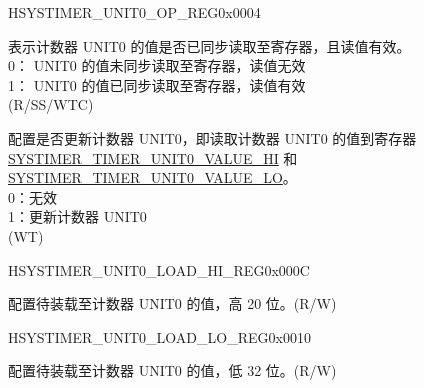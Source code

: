 \begin{register}{H}{SYSTIMER\_UNIT0\_OP\_REG}{0x0004}\label{regdesc:SYSTIMERUNIT0OPREG}
%
%
%
%
\regnewline%
\begin{regdesc}\begin{reglist}
\label{fielddesc:SYSTIMERTIMERUNIT0VALUEVALID}\item [SYSTIMER\_TIMER\_UNIT0\_VALUE\_VALID] 表示计数器 UNIT0 的值是否已同步读取至寄存器，且读值有效。\\
0： UNIT0 的值未同步读取至寄存器，读值无效\\
1： UNIT0 的值已同步读取至寄存器，读值有效\\
(R/SS/WTC)
\label{fielddesc:SYSTIMERTIMERUNIT0UPDATE}\item [SYSTIMER\_TIMER\_UNIT0\_UPDATE] 配置是否更新计数器 UNIT0，即读取计数器 UNIT0 的值到寄存器 \hyperref[fielddesc:SYSTIMERTIMERUNIT0VALUEHI]{SYSTIMER\_TIMER\_UNIT0\_VALUE\_HI} 和 \hyperref[fielddesc:SYSTIMERTIMERUNIT0VALUELO]{SYSTIMER\_TIMER\_UNIT0\_VALUE\_LO}。\\
0：无效\\
1：更新计数器 UNIT0\\
(WT)
\end{reglist}\end{regdesc}
\end{register}


\begin{register}{H}{SYSTIMER\_UNIT0\_LOAD\_HI\_REG}{0x000C}\label{regdesc:SYSTIMERUNIT0LOADHIREG}
%
%
\regnewline%
\begin{regdesc}\begin{reglist}
\label{fielddesc:SYSTIMERTIMERUNIT0LOADHI}\item [SYSTIMER\_TIMER\_UNIT0\_LOAD\_HI] 配置待装载至计数器 UNIT0 的值，高 20 位。(R/W)
\end{reglist}\end{regdesc}
\end{register}


\begin{register}{H}{SYSTIMER\_UNIT0\_LOAD\_LO\_REG}{0x0010}\label{regdesc:SYSTIMERUNIT0LOADLOREG}
%
\regnewline%
\begin{regdesc}\begin{reglist}
\label{fielddesc:SYSTIMERTIMERUNIT0LOADLO}\item [SYSTIMER\_TIMER\_UNIT0\_LOAD\_LO] 配置待装载至计数器 UNIT0 的值，低 32 位。(R/W)
\end{reglist}\end{regdesc}
\end{register}



